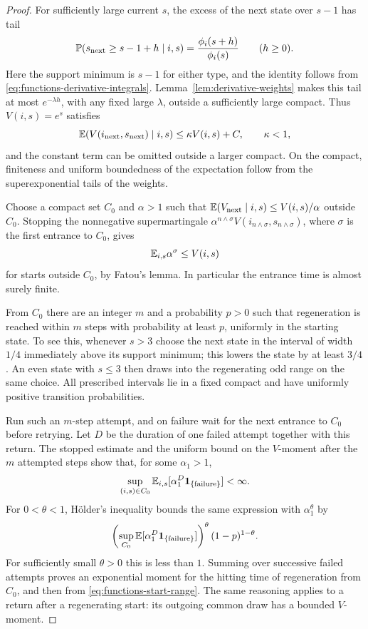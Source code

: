 \begin{proof}
For sufficiently large current \(s\), the excess of the next state
over \(s-1\) has tail
\[
 \mathbb P(s_{\rm next}\ge s-1+h\mid i,s)
 =\frac{\phi_i(s+h)}{\phi_i(s)}\qquad(h\ge0).
\]
Here the support minimum is \(s-1\) for either type, and the identity
follows from \eqref{eq:functions-derivative-integrals}.
Lemma~\ref{lem:derivative-weights} makes this tail at most
\(e^{-\lambda h}\), with any fixed large \(\lambda\), outside a
sufficiently large compact.  Thus \(V(i,s)=e^s\) satisfies
\[
 \mathbb E(V(i_{\rm next},s_{\rm next})\mid i,s)
 \le \kappa V(i,s)+C,\qquad \kappa<1,
\]
and the constant term can be omitted outside a larger compact.
On the compact, finiteness and uniform boundedness of the expectation
follow from the superexponential tails of the weights.

Choose a compact set \(C_0\) and \(\alpha>1\) such that
\(\mathbb E(V_{\rm next}\mid i,s)\le V(i,s)/\alpha\) outside \(C_0\).
Stopping the nonnegative supermartingale
\(\alpha^{n\wedge\sigma}V(i_{n\wedge\sigma},s_{n\wedge\sigma})\),
where \(\sigma\) is the first entrance to \(C_0\), gives
\[
 \mathbb E_{i,s}\alpha^\sigma\le V(i,s)
\]
for starts outside \(C_0\), by Fatou's lemma.
In particular the entrance time is almost surely finite.

From \(C_0\) there are an integer \(m\) and a probability \(p>0\)
such that regeneration is reached within \(m\) steps with probability
at least \(p\), uniformly in the starting state.
To see this, whenever \(s>3\) choose the next state in the interval
of width \(1/4\) immediately above its support minimum; this lowers
the state by at least \(3/4\).
An even state with \(s\le3\) then draws into the regenerating odd
range on the same choice.
All prescribed intervals lie in a fixed compact and have uniformly
positive transition probabilities.

Run such an \(m\)-step attempt, and on failure wait for the next
entrance to \(C_0\) before retrying.  Let \(D\) be the duration of
one failed attempt together with this return.  The stopped estimate
and the uniform bound on the \(V\)-moment after the \(m\) attempted
steps show that, for some \(\alpha_1>1\),
\[
 \sup_{(i,s)\in C_0}\mathbb E_{i,s}
       [\alpha_1^D\mathbf 1_{\{\text{failure}\}}]<\infty.
\]
For \(0<\theta<1\), Hölder's inequality bounds the same expression
with \(\alpha_1^\theta\) by
\[
 \left(\sup_{C_0}\mathbb E[
       \alpha_1^D\mathbf 1_{\{\text{failure}\}}]\right)^\theta
 (1-p)^{1-\theta}.
\]
For sufficiently small \(\theta>0\) this is less than \(1\).
Summing over successive failed attempts proves an exponential
moment for the hitting time of regeneration from \(C_0\), and then
from \eqref{eq:functions-start-range}.
The same reasoning applies to a return after a regenerating start:
its outgoing common draw has a bounded \(V\)-moment.


\end{proof}
